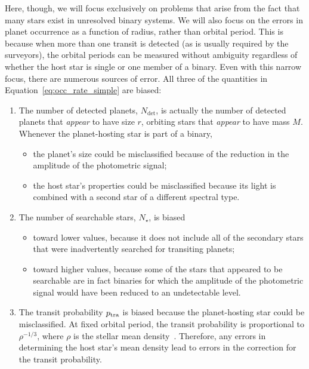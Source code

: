 \documentclass[12pt,modern]{aastex61}
\begin{document}
Here, though, we will focus exclusively on problems that arise from
the fact that many stars exist in unresolved binary systems.  We will
also focus on the errors in planet occurrence as a function of radius,
rather than orbital period. This is because when more than one transit
is detected (as is usually required by the surveyors), the orbital
periods can be measured without ambiguity regardless of whether the
host star is single or one member of a binary.  Even with this narrow
focus, there are numerous sources of error.  All three of the
quantities in Equation~\ref{eq:occ_rate_simple} are biased:
\begin{enumerate}
%    
    \item The number of detected planets, $N_{\det}$, is actually the
      number of detected planets that {\it appear} to have size $r$,
      orbiting stars that {\it appear} to have mass $M$.  Whenever the
      planet-hosting star is part of a binary,
%    
    \begin{itemize}
        \item the planet's size could be misclassified because of the
          reduction in the amplitude of the photometric signal;
%        
        \item the host star's properties could be misclassified
          because its light is combined with a second star of a
          different spectral type.
%        
    \end{itemize}
%    
    \item The number of searchable stars, $N_\star$, is biased
%    
    \begin{itemize}
%        
        \item toward lower values, because it does not include all of
          the secondary stars that were inadvertently searched for
          transiting planets;
%        
        \item toward higher values, because some of the stars that
          appeared to be searchable are in fact binaries for which the
          amplitude of the photometric signal would have been reduced
          to an undetectable level.
%        
    \end{itemize}
%    
    \item The transit probability $p_{\rm tra}$ is biased because the
      planet-hosting star could be misclassified.  At fixed orbital
      period, the transit probability is proportional to
      $\rho^{-1/3}$, where $\rho$ is the stellar mean
      density~\citep{Winn2010}.  Therefore, any errors in determining
      the host star's mean density lead to errors in the correction
      for the transit probability.
%    
\end{enumerate}
\end{document}
